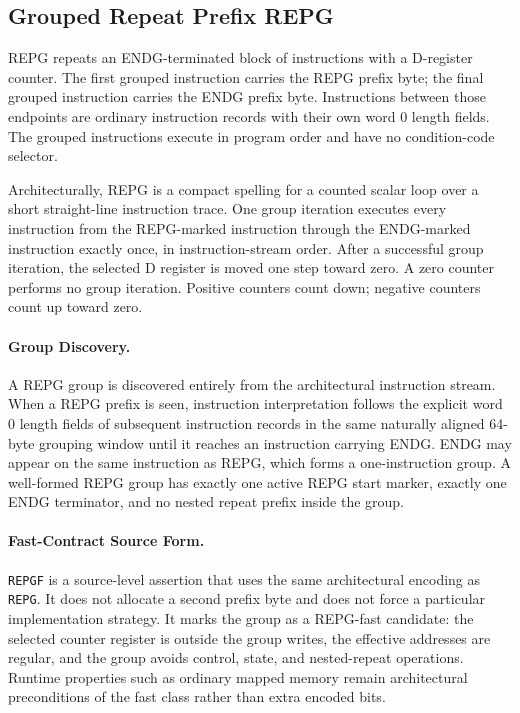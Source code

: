 \subsection{Grouped Repeat Prefix REPG}
REPG repeats an ENDG-terminated block of instructions with a D-register
counter. The first grouped instruction carries the REPG prefix byte; the final
grouped instruction carries the ENDG prefix byte. Instructions between those
endpoints are ordinary instruction records with their own word 0 length fields.
The grouped instructions execute in program order and have no condition-code
selector.

Architecturally, REPG is a compact spelling for a counted scalar loop over a
short straight-line instruction trace. One group iteration executes every
instruction from the REPG-marked instruction through the ENDG-marked instruction
exactly once, in instruction-stream order. After a successful group iteration,
the selected D register is moved one step toward zero. A zero counter performs
no group iteration. Positive counters count down; negative counters count up
toward zero.

\paragraph{Group Discovery.}
A REPG group is discovered entirely from the architectural instruction stream.
When a REPG prefix is seen, instruction interpretation follows the explicit word
0 length fields of subsequent instruction records in the same naturally aligned
64-byte grouping window until it reaches an instruction carrying ENDG. ENDG may
appear on the same instruction as REPG, which forms a one-instruction group. A
well-formed REPG group has exactly one active REPG start marker, exactly one ENDG
terminator, and no nested repeat prefix inside the group.

\paragraph{Fast-Contract Source Form.}
\texttt{REPGF} is a source-level assertion that uses the same architectural
encoding as \texttt{REPG}. It does not allocate a second prefix byte and does
not force a particular implementation strategy. It marks the group as a
REPG-fast candidate: the selected counter register is outside the group writes,
the effective addresses are regular, and the group avoids control, state, and
nested-repeat operations. Runtime properties such as ordinary mapped memory
remain architectural preconditions of the fast class rather than extra encoded
bits.

